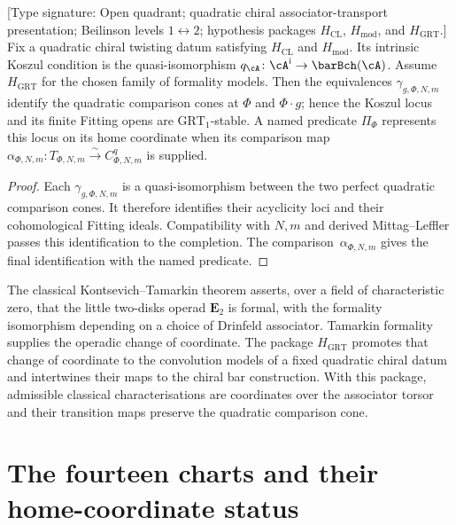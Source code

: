\begin{corollary}
\label{v1-cor:kms-grt-invariant}
\ClaimStatusConditional
\textup{[Type signature: Open quadrant; quadratic chiral
associator-transport presentation; Beilinson levels
$1\leftrightarrow2$; hypothesis packages $H_{\mathrm{CL}}$,
$H_{\mathrm{mod}}$, and $H_{\mathrm{GRT}}$.]}
Fix a quadratic chiral twisting datum satisfying
$H_{\mathrm{CL}}$ and $H_{\mathrm{mod}}$.  Its intrinsic Koszul
condition is the quasi-isomorphism
$q_\cA\colon\cA^{\mathrm i}\to\barBch(\cA)$.  Assume
$H_{\mathrm{GRT}}$ for the chosen family of formality models.  Then
the equivalences $\gamma_{g,\Phi,N,m}$ identify the quadratic
comparison cones at $\Phi$ and $\Phi\cdot g$; hence the Koszul locus
and its finite Fitting opens are $\mathrm{GRT}_1$-stable.  A named
predicate $\Pi_\Phi$ represents this locus on its home coordinate
when its comparison map
$\alpha_{\Phi,N,m}\colon T_{\Phi,N,m}\xrightarrow{\sim}
C^q_{\Phi,N,m}$ is supplied.
\end{corollary}

\begin{proof}
Each $\gamma_{g,\Phi,N,m}$ is a quasi-isomorphism between the two
perfect quadratic comparison cones.  It therefore identifies their
acyclicity loci and their cohomological Fitting ideals.  Compatibility
with $N,m$ and derived Mittag--Leffler passes this identification to
the completion.  The comparison~$\alpha_{\Phi,N,m}$ gives the final
identification with the named predicate.
\end{proof}

\begin{remark}
\label{v1-rem:kms-kt-operational}
The classical Kontsevich--Tamarkin theorem asserts, over a
field of characteristic zero, that the little two-disks
operad $\mathbf{E}_2$ is formal, with the formality
isomorphism depending on a choice of Drinfeld associator.
Tamarkin formality supplies the operadic change of coordinate.
The package $H_{\mathrm{GRT}}$ promotes that change of coordinate to
the convolution models of a fixed quadratic chiral datum and
intertwines their maps to the chiral bar construction.  With this
package, admissible classical characterisations are coordinates over
the associator torsor and their transition maps preserve the
quadratic comparison cone.
\end{remark}

\section{The fourteen charts and their home-coordinate status}
\label{v1-sec:kms-atlas}


